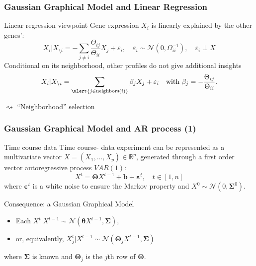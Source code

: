 \begin{frame}
  \frametitle{Gaussian Graphical Model and Linear Regression}

  \begin{block}{Linear regression viewpoint}
    Gene expression $X_i$ is linearly explained by the other genes':
    \begin{equation*}
      X_i | X_{ \setminus i} = - \sum_{j \neq i}
      \frac{\Theta_{ij}}{\Theta_{ii}} X_j + \varepsilon_i,\quad \varepsilon_i
      \sim \mathcal{N}(0,\Omega_{ii}^{-1}), \quad \varepsilon_i \perp X
      \end{equation*}
      Conditional  on its  neighborhood,  other profiles  do not  give
      additional insights
    \begin{equation*}
      X_i | X_{ \setminus i} = \sum_{\alert{j \in \text{neighbors}(i)}} \beta_j X_j + \varepsilon_i
      \quad         \text{with         }         \beta_j         =
      -\frac{\Theta_{ij}}{\Theta_{ii}}.
    \end{equation*}
  \end{block}

  \alert{$\rightsquigarrow$ ``Neighborhood'' selection}

\end{frame}


\begin{frame}
  \frametitle{Gaussian Graphical Model and AR process (1)}
  
  \begin{block}{Time course data}
    Time course- data experiment can  be  represented  as   a  multivariate  vector
    $X=(X_1,\dots,X_p)\in\mathbb{R}^p$,  generated  through a
    \alert{first order vector autoregressive} process $VAR(1)$:
    \begin{equation*}
      X^{t}   =   \boldsymbol\Theta   X^{t-1}   +   \mathbf{b}   +
      \boldsymbol\varepsilon^{t},\quad t \in [1,n]
    \end{equation*}
    where  $\boldsymbol\varepsilon^{t}$ is  a white  noise to  ensure  the Markov
    property and $X^{0} \sim \mathcal{N}(0, \boldsymbol\Sigma^0)$.
  \end{block}

   \vfill
 
   \begin{block}{Consequence: a Gaussian Graphical Model}
     \begin{itemize}
     \item        Each       $X^{t}        |        X^{t-1}       \sim
       \mathcal{N}(\mathbf{\theta}X^{t-1}, \boldsymbol\Sigma)$, 
     \item  or,  equivalently,  $X_j^{t}  |  X^{t-1}  \sim
       \mathcal{N}(\boldsymbol\Theta_jX^{t-1}, \boldsymbol\Sigma)$
     \end{itemize}
     where $\boldsymbol\Sigma$ is known and $\boldsymbol\Theta_j$ is the
     $j$th row of $\boldsymbol\Theta$.
   \end{block}
 \end{frame}


